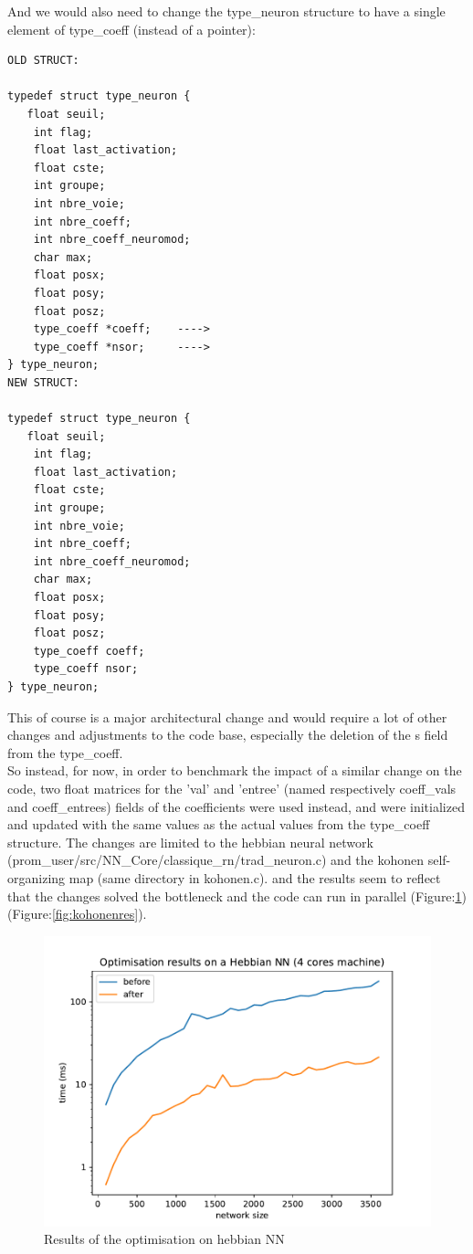 \documentclass {article}
\begin{document}
And we would also need to change the type\_neuron structure to have a single
element of type\_coeff (instead of a pointer):
\begin{lstlisting}[numbers=none,frame=none,xleftmargin=3em, multicols=2]
OLD STRUCT:

typedef struct type_neuron {
   float seuil;
	int flag;
	float last_activation;
	float cste;
	int groupe;
	int nbre_voie;
	int nbre_coeff;
	int nbre_coeff_neuromod;
	char max;
	float posx;
	float posy;
	float posz;
	type_coeff *coeff;    ---->
	type_coeff *nsor;     ---->
} type_neuron;
NEW STRUCT:

typedef struct type_neuron {
   float seuil;
	int flag;
	float last_activation;
	float cste;
	int groupe;
	int nbre_voie;
	int nbre_coeff;
	int nbre_coeff_neuromod;
	char max;
	float posx;
	float posy;
	float posz;
	type_coeff coeff;
	type_coeff nsor;
} type_neuron;

\end{lstlisting}

This of course is a major architectural change and would require a lot of other
changes and adjustments to the code base, especially the deletion of the s field 
from the type\_coeff.\\

So instead, for now, in order to benchmark the impact of a similar change on
the code, two float matrices for the 'val' and 'entree' (named respectively
coeff\_vals and coeff\_entrees) fields of the coefficients
were used instead, and were initialized and updated with the same values as the
actual values from the type\_coeff structure. The changes are limited to the
hebbian neural network (prom\_user/src/NN\_Core/classique\_rn/trad\_neuron.c)
and the kohonen self-organizing map (same directory in kohonen.c). and the
results seem to reflect that the changes solved the bottleneck and the code can
run in parallel (Figure:\ref{fig:hebbres}) (Figure:\ref{fig:kohonenres}). 

\begin{figure}[h]
    \includegraphics[width=\linewidth]{plot/hebbres.pdf}
    \caption{Results of the optimisation on hebbian NN}
    \label{fig:hebbres}
\end{figure}
\end{document}
